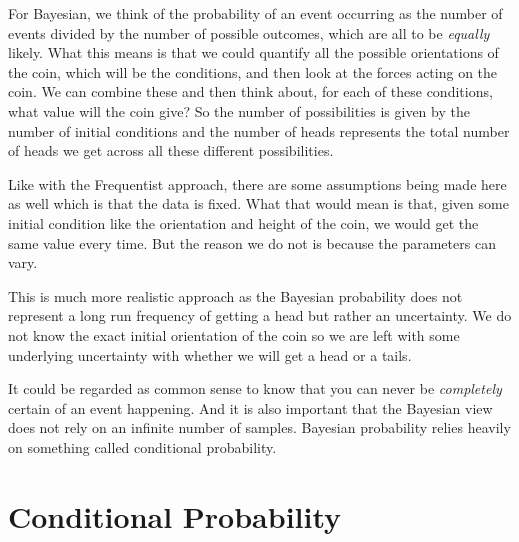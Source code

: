 \documentclass[12pt,twoside]{report}   %
\begin{document}
For Bayesian, we think of the probability of an event occurring as the number of events divided by the number of possible outcomes, which are all to be \textit{equally} likely. What this means is that we could quantify all the possible orientations of the coin, which will be the  conditions, and then look at the forces acting on the coin. We can combine these and then think about, for each of these conditions, what value will the coin give? So the number of possibilities is given by the number of initial conditions and the number of heads represents the total number of heads we get across all these different possibilities.

Like with the Frequentist approach, there are some assumptions being made here as well which is that the data is fixed. What that would mean is that, given some initial condition like the orientation and height of the coin, we would get the same value every time. But the reason we do not is because the parameters can vary.

This is much more realistic approach as the Bayesian probability does not represent a long run frequency of getting a head but rather an uncertainty. We do not know the exact initial orientation of the coin so we are left with some underlying uncertainty with whether we will get a head or a tails.

It could be regarded as common sense to know that you can never be \textit{completely} certain of an event happening. And it is also important that the Bayesian view does not rely on an infinite number of samples. Bayesian probability relies heavily on something called conditional probability.

\section{Conditional Probability}\label{Conditional Probability}
\vspace{-0.4in}
\underline{\hspace{6.2in}}
\vspace{-0.1in}
\end{document}
